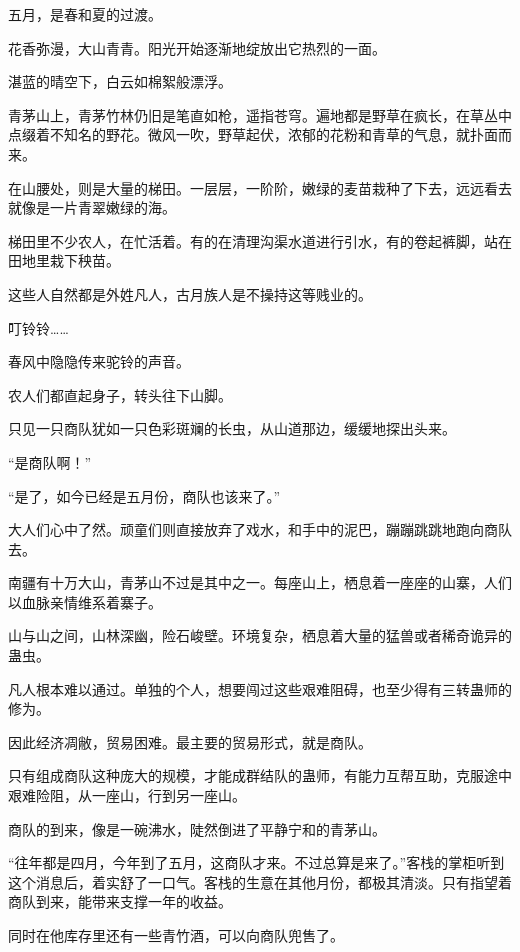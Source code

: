 
\begin{this_body}



五月，是春和夏的过渡。

花香弥漫，大山青青。阳光开始逐渐地绽放出它热烈的一面。

湛蓝的晴空下，白云如棉絮般漂浮。

青茅山上，青茅竹林仍旧是笔直如枪，遥指苍穹。遍地都是野草在疯长，在草丛中点缀着不知名的野花。微风一吹，野草起伏，浓郁的花粉和青草的气息，就扑面而来。

在山腰处，则是大量的梯田。一层层，一阶阶，嫩绿的麦苗栽种了下去，远远看去就像是一片青翠嫩绿的海。

梯田里不少农人，在忙活着。有的在清理沟渠水道进行引水，有的卷起裤脚，站在田地里栽下秧苗。

这些人自然都是外姓凡人，古月族人是不操持这等贱业的。

叮铃铃……

春风中隐隐传来驼铃的声音。

农人们都直起身子，转头往下山脚。

只见一只商队犹如一只色彩斑斓的长虫，从山道那边，缓缓地探出头来。

“是商队啊！”

“是了，如今已经是五月份，商队也该来了。”

大人们心中了然。顽童们则直接放弃了戏水，和手中的泥巴，蹦蹦跳跳地跑向商队去。

南疆有十万大山，青茅山不过是其中之一。每座山上，栖息着一座座的山寨，人们以血脉亲情维系着寨子。

山与山之间，山林深幽，险石峻壁。环境复杂，栖息着大量的猛兽或者稀奇诡异的蛊虫。

凡人根本难以通过。单独的个人，想要闯过这些艰难阻碍，也至少得有三转蛊师的修为。

因此经济凋敝，贸易困难。最主要的贸易形式，就是商队。

只有组成商队这种庞大的规模，才能成群结队的蛊师，有能力互帮互助，克服途中艰难险阻，从一座山，行到另一座山。

商队的到来，像是一碗沸水，陡然倒进了平静宁和的青茅山。

“往年都是四月，今年到了五月，这商队才来。不过总算是来了。”客栈的掌柜听到这个消息后，着实舒了一口气。客栈的生意在其他月份，都极其清淡。只有指望着商队到来，能带来支撑一年的收益。

同时在他库存里还有一些青竹酒，可以向商队兜售了。


\end{this_body}
